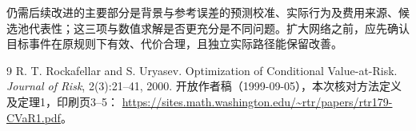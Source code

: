 \documentclass[UTF8,a4paper,11pt]{ctexart}
\begin{document}
仍需后续改进的主要部分是背景与参考误差的预测校准、实际行为及费用来源、候选池代表性；这三项与数值求解是否更充分是不同问题。扩大网络之前，应先确认目标事件在原规则下有效、代价合理，且独立实际路径能保留改善。

\begin{thebibliography}{9}
 R. T. Rockafellar and S. Uryasev.
Optimization of Conditional Value-at-Risk. \emph{Journal of Risk}, 2(3):21--41, 2000.
开放作者稿（1999-09-05），本次核对方法定义及定理1，印刷页3--5：
\url{https://sites.math.washington.edu/~rtr/papers/rtr179-CVaR1.pdf}。
\end{thebibliography}
\end{document}

